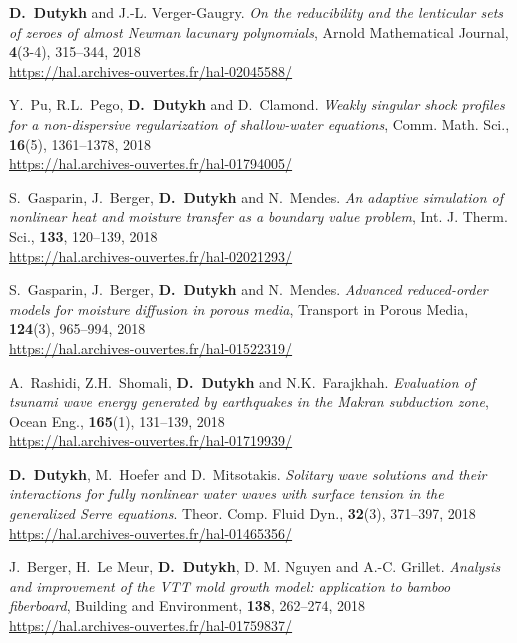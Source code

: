 \begin{etaremune}
  
  \item \textbf{D.~Dutykh} and J.-L. Verger-Gaugry. \textit{On the reducibility and the lenticular sets of zeroes of almost Newman lacunary polynomials}, Arnold Mathematical Journal, \textbf{4}(3-4), 315--344, 2018 \\ %
  \url{https://hal.archives-ouvertes.fr/hal-02045588/}
  
  \item Y.~Pu, R.L.~Pego, \textbf{D.~Dutykh} and D.~Clamond. \textit{Weakly singular shock profiles for a non-dispersive regularization of shallow-water equations}, Comm. Math. Sci., \textbf{16}(5), 1361--1378, 2018 \\ %
  \url{https://hal.archives-ouvertes.fr/hal-01794005/}
  
  \item S.~Gasparin, J.~Berger, \textbf{D.~Dutykh} and N.~Mendes. \textit{An adaptive simulation of nonlinear heat and moisture transfer as a boundary value problem}, Int. J. Therm. Sci., \textbf{133}, 120--139, 2018 \\ %
  \url{https://hal.archives-ouvertes.fr/hal-02021293/}

  \item S.~Gasparin, J.~Berger, \textbf{D.~Dutykh} and N.~Mendes. \textit{Advanced reduced-order models for moisture diffusion in porous media}, Transport in Porous Media, \textbf{124}(3), 965--994, 2018 \\ %
  \url{https://hal.archives-ouvertes.fr/hal-01522319/}
  
  \item A.~Rashidi, Z.H.~Shomali, \textbf{D.~Dutykh} and N.K.~Farajkhah. \textit{Evaluation of tsunami wave energy generated by earthquakes in the Makran subduction zone}, Ocean Eng., \textbf{165}(1), 131--139, 2018 \\ %
  \url{https://hal.archives-ouvertes.fr/hal-01719939/}

  \item \textbf{D.~Dutykh}, M.~Hoefer and D.~Mitsotakis. \textit{Solitary wave solutions and their interactions for fully nonlinear water waves with surface tension in the generalized Serre equations}. Theor. Comp. Fluid Dyn., \textbf{32}(3), 371--397, 2018 \\ %
  \url{https://hal.archives-ouvertes.fr/hal-01465356/}

  \item J.~Berger, H.~Le Meur, \textbf{D.~Dutykh}, D. M. Nguyen and A.-C. Grillet. \textit{Analysis and improvement of the VTT mold growth model: application to bamboo fiberboard}, Building and Environment, \textbf{138}, 262--274, 2018 \\ %
  \url{https://hal.archives-ouvertes.fr/hal-01759837/}


\end{etaremune}
